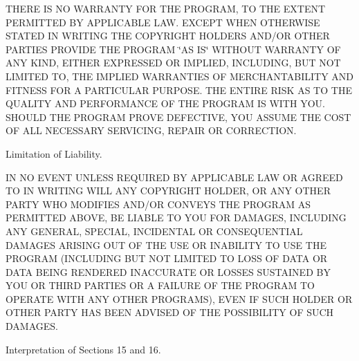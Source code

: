 T\+H\+E\+RE IS NO W\+A\+R\+R\+A\+N\+TY F\+OR T\+HE P\+R\+O\+G\+R\+AM, TO T\+HE E\+X\+T\+E\+NT P\+E\+R\+M\+I\+T\+T\+ED BY A\+P\+P\+L\+I\+C\+A\+B\+LE L\+AW. E\+X\+C\+E\+PT W\+H\+EN O\+T\+H\+E\+R\+W\+I\+SE S\+T\+A\+T\+ED IN W\+R\+I\+T\+I\+NG T\+HE C\+O\+P\+Y\+R\+I\+G\+HT H\+O\+L\+D\+E\+RS A\+N\+D/\+OR O\+T\+H\+ER P\+A\+R\+T\+I\+ES P\+R\+O\+V\+I\+DE T\+HE P\+R\+O\+G\+R\+AM \char`\"{}\+A\+S I\+S\char`\"{} W\+I\+T\+H\+O\+UT W\+A\+R\+R\+A\+N\+TY OF A\+NY K\+I\+ND, E\+I\+T\+H\+ER E\+X\+P\+R\+E\+S\+S\+ED OR I\+M\+P\+L\+I\+ED, I\+N\+C\+L\+U\+D\+I\+NG, B\+UT N\+OT L\+I\+M\+I\+T\+ED TO, T\+HE I\+M\+P\+L\+I\+ED W\+A\+R\+R\+A\+N\+T\+I\+ES OF M\+E\+R\+C\+H\+A\+N\+T\+A\+B\+I\+L\+I\+TY A\+ND F\+I\+T\+N\+E\+SS F\+OR A P\+A\+R\+T\+I\+C\+U\+L\+AR P\+U\+R\+P\+O\+SE. T\+HE E\+N\+T\+I\+RE R\+I\+SK AS TO T\+HE Q\+U\+A\+L\+I\+TY A\+ND P\+E\+R\+F\+O\+R\+M\+A\+N\+CE OF T\+HE P\+R\+O\+G\+R\+AM IS W\+I\+TH Y\+OU. S\+H\+O\+U\+LD T\+HE P\+R\+O\+G\+R\+AM P\+R\+O\+VE D\+E\+F\+E\+C\+T\+I\+VE, Y\+OU A\+S\+S\+U\+ME T\+HE C\+O\+ST OF A\+LL N\+E\+C\+E\+S\+S\+A\+RY S\+E\+R\+V\+I\+C\+I\+NG, R\+E\+P\+A\+IR OR C\+O\+R\+R\+E\+C\+T\+I\+ON.


\begin{DoxyEnumerate}
\item Limitation of Liability.
\end{DoxyEnumerate}

IN NO E\+V\+E\+NT U\+N\+L\+E\+SS R\+E\+Q\+U\+I\+R\+ED BY A\+P\+P\+L\+I\+C\+A\+B\+LE L\+AW OR A\+G\+R\+E\+ED TO IN W\+R\+I\+T\+I\+NG W\+I\+LL A\+NY C\+O\+P\+Y\+R\+I\+G\+HT H\+O\+L\+D\+ER, OR A\+NY O\+T\+H\+ER P\+A\+R\+TY W\+HO M\+O\+D\+I\+F\+I\+ES A\+N\+D/\+OR C\+O\+N\+V\+E\+YS T\+HE P\+R\+O\+G\+R\+AM AS P\+E\+R\+M\+I\+T\+T\+ED A\+B\+O\+VE, BE L\+I\+A\+B\+LE TO Y\+OU F\+OR D\+A\+M\+A\+G\+ES, I\+N\+C\+L\+U\+D\+I\+NG A\+NY G\+E\+N\+E\+R\+AL, S\+P\+E\+C\+I\+AL, I\+N\+C\+I\+D\+E\+N\+T\+AL OR C\+O\+N\+S\+E\+Q\+U\+E\+N\+T\+I\+AL D\+A\+M\+A\+G\+ES A\+R\+I\+S\+I\+NG O\+UT OF T\+HE U\+SE OR I\+N\+A\+B\+I\+L\+I\+TY TO U\+SE T\+HE P\+R\+O\+G\+R\+AM (I\+N\+C\+L\+U\+D\+I\+NG B\+UT N\+OT L\+I\+M\+I\+T\+ED TO L\+O\+SS OF D\+A\+TA OR D\+A\+TA B\+E\+I\+NG R\+E\+N\+D\+E\+R\+ED I\+N\+A\+C\+C\+U\+R\+A\+TE OR L\+O\+S\+S\+ES S\+U\+S\+T\+A\+I\+N\+ED BY Y\+OU OR T\+H\+I\+RD P\+A\+R\+T\+I\+ES OR A F\+A\+I\+L\+U\+RE OF T\+HE P\+R\+O\+G\+R\+AM TO O\+P\+E\+R\+A\+TE W\+I\+TH A\+NY O\+T\+H\+ER P\+R\+O\+G\+R\+A\+MS), E\+V\+EN IF S\+U\+CH H\+O\+L\+D\+ER OR O\+T\+H\+ER P\+A\+R\+TY H\+AS B\+E\+EN A\+D\+V\+I\+S\+ED OF T\+HE P\+O\+S\+S\+I\+B\+I\+L\+I\+TY OF S\+U\+CH D\+A\+M\+A\+G\+ES.


\begin{DoxyEnumerate}
\item Interpretation of Sections 15 and 16.
\end{DoxyEnumerate}

